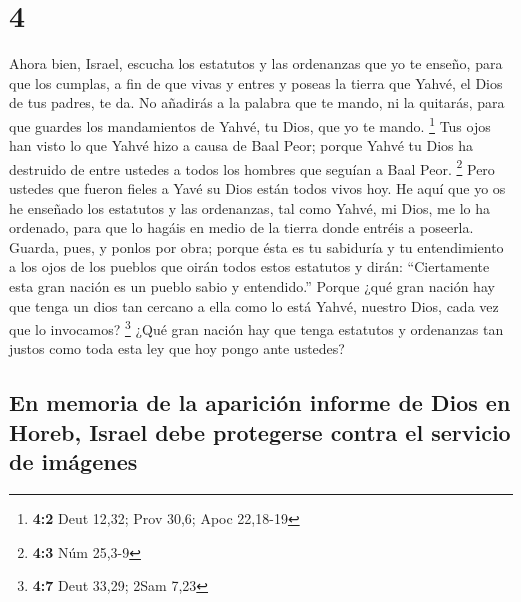 \hypertarget{section-3}{%
\section{4}\label{section-3}}

 Ahora bien, Israel, escucha los estatutos y las
ordenanzas que yo te enseño, para que los cumplas, a fin de que vivas y
entres y poseas la tierra que Yahvé, el Dios de tus padres, te da.
 No añadirás a la palabra que te mando, ni la quitarás,
para que guardes los mandamientos de Yahvé, tu Dios, que yo te mando.
\footnote{\textbf{4:2} Deut 12,32; Prov 30,6; Apoc 22,18-19}
 Tus ojos han visto lo que Yahvé hizo a causa de Baal
Peor; porque Yahvé tu Dios ha destruido de entre ustedes a todos los
hombres que seguían a Baal Peor. \footnote{\textbf{4:3} Núm 25,3-9}
 Pero ustedes que fueron fieles a Yavé su Dios están todos
vivos hoy.  He aquí que yo os he enseñado los estatutos y
las ordenanzas, tal como Yahvé, mi Dios, me lo ha ordenado, para que lo
hagáis en medio de la tierra donde entréis a poseerla. 
Guarda, pues, y ponlos por obra; porque ésta es tu sabiduría y tu
entendimiento a los ojos de los pueblos que oirán todos estos estatutos
y dirán: ``Ciertamente esta gran nación es un pueblo sabio y
entendido.''  Porque ¿qué gran nación hay que tenga un
dios tan cercano a ella como lo está Yahvé, nuestro Dios, cada vez que
lo invocamos? \footnote{\textbf{4:7} Deut 33,29; 2Sam 7,23}
 ¿Qué gran nación hay que tenga estatutos y ordenanzas tan
justos como toda esta ley que hoy pongo ante ustedes?

\hypertarget{en-memoria-de-la-apariciuxf3n-informe-de-dios-en-horeb-israel-debe-protegerse-contra-el-servicio-de-imuxe1genes}{%
\subsection{En memoria de la aparición informe de Dios en Horeb, Israel
debe protegerse contra el servicio de
imágenes}\label{en-memoria-de-la-apariciuxf3n-informe-de-dios-en-horeb-israel-debe-protegerse-contra-el-servicio-de-imuxe1genes}}

